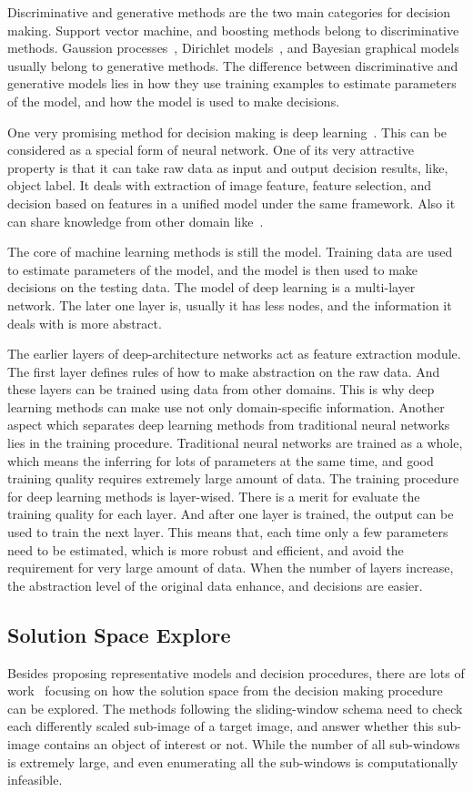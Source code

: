 Discriminative and generative methods are the two main categories for decision making.
Support vector machine, and boosting methods belong to discriminative methods. Gaussion processes~\citep{gprocess}, Dirichlet models~\citep{lda,dp,hdp}, and Bayesian graphical models~\citep{bgm} usually belong to generative methods. The difference between discriminative and generative models lies in how they use training examples to estimate parameters of the model, and how the model is used to make decisions.

One very promising method for decision making is deep learning~\citep{dlearn}. This can be considered as a special form of neural network. One of its very attractive property is that it can take raw data as input and output decision results, like, object label. It deals with extraction of image feature, feature selection, and decision based on features in a unified model under the same framework. Also it can share knowledge from other domain like~\citep{tlsurvey}.

The core of machine learning methods is still the model. Training data are used to estimate  parameters of the model, and the model is then used to make decisions on the testing data. The model of deep learning is a multi-layer network. The later one layer is, usually it has less nodes, and the information it deals with is more abstract.

The earlier layers of deep-architecture networks act as feature extraction module. The first layer defines rules of how to make abstraction on the raw data. And these layers can be trained using  data from other domains. This is why deep learning methods can make use not only domain-specific information. Another aspect which separates deep learning methods from traditional neural networks lies in the training procedure. Traditional neural networks are trained as a whole, which means the inferring for lots of parameters at the same time, and good training quality  requires extremely large amount of data. The training procedure for deep learning methods is layer-wised. There is a merit for evaluate the training quality for each layer. And after one layer is trained, the output can be used to train the next layer. This means that, each time only a few parameters need to be estimated, which is more robust and efficient, and avoid the requirement for very large amount of data. When the number of layers increase, the abstraction level of the original data enhance, and decisions are easier.


\subsection{Solution Space Explore}
Besides proposing representative models and decision procedures, there are lots of work~\citep{408,spm,ciod} focusing on how the solution space from the decision making procedure can be explored. The methods following the sliding-window schema need to check each differently scaled sub-image of a target image, and answer whether this sub-image contains an object of interest or not. While the number of all sub-windows is extremely large, and even enumerating all the sub-windows is computationally infeasible.

